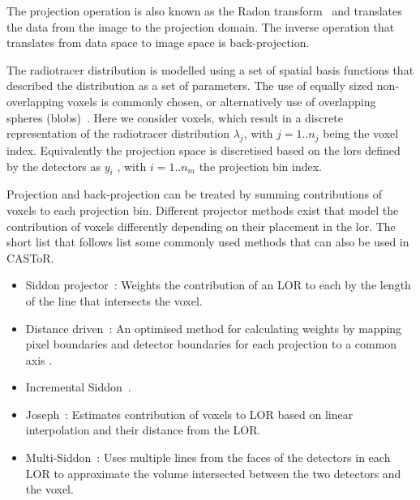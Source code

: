 The projection operation is also known as the Radon transform~\cite{radon1917} and translates the data from the image to the projection domain. The inverse operation that translates from data space to image space is back-projection.

The radiotracer distribution is modelled using a set of spatial basis functions that described the distribution as a set of parameters. The use of equally sized non-overlapping voxels is commonly chosen, or alternatively use of overlapping spheres (blobs)~\cite{Matej1996}. Here we consider voxels, which result in a discrete representation of the radiotracer distribution $\lambda_j$, with $j=1..n_j$ being the voxel index. 
Equivalently the projection space is discretised based on the \glspl{lor} defined by the detectors as $y_i$ , with $i=1..n_m$ the projection bin index.

Projection and back-projection can be treated by summing contributions of voxels to each projection bin. Different projector methods exist that model the contribution of voxels differently depending on their placement in the \gls{lor}. The short list that follows list some commonly used methods that can also be used in CASToR. 

\begin{itemize}
\item  Siddon projector~\cite{Siddon1985}: Weights the contribution of an LOR to each by the length of the line that intersects the voxel.
\item  Distance driven~\cite{DeMan2004}: An optimised method for calculating weights by mapping pixel boundaries and detector boundaries for each projection to a common axis .
\item  Incremental Siddon~\cite{Jacobs2015}.
\item  Joseph~\cite{Joseph1982}: Estimates contribution of voxels to LOR based on linear interpolation and their distance from the LOR. 
\item  Multi-Siddon~\cite{Moehrs2008}: Uses multiple lines from the faces of the detectors in each LOR to approximate the volume intersected between the two detectors and the voxel.
\end{itemize}


